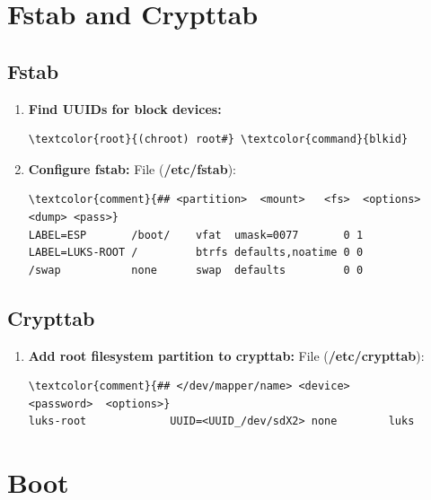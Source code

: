 \documentclass[10pt, a4paper, onecolumn, oneside, titlepage, openany]{book}
\begin{document}
\section{Fstab and Crypttab}
\subsection{Fstab}
\begin{enumerate}
    \item \textbf{Find UUIDs for block devices:}
\begin{Verbatim}[commandchars=\\\{\}]
\textcolor{root}{(chroot) root#} \textcolor{command}{blkid}
\end{Verbatim}
    \item \textbf{Configure fstab:}
\newline File (\textbf{\textcolor{file}{/etc/fstab}}):
\begin{Verbatim}[commandchars=\\\{\}]
\textcolor{comment}{## <partition>  <mount>   <fs>  <options>        <dump> <pass>}
LABEL=ESP       /boot/    vfat  umask=0077       0 1
LABEL=LUKS-ROOT /         btrfs defaults,noatime 0 0
/swap           none      swap  defaults         0 0
\end{Verbatim}
\end{enumerate}
\subsection{Crypttab}
\begin{enumerate}
    \item \textbf{Add root filesystem partition to crypttab:}
\newline File (\textbf{\textcolor{file}{/etc/crypttab}}):
\begin{Verbatim}[commandchars=\\\{\}]
\textcolor{comment}{## </dev/mapper/name> <device>              <password>  <options>}
luks-root             UUID=<UUID_/dev/sdX2> none        luks
\end{Verbatim}
\end{enumerate}

\section{Boot}
\end{document}

